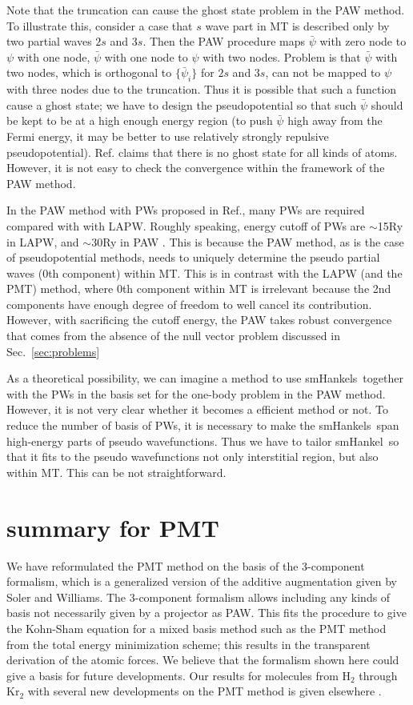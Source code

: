 \documentclass[twocolumn,showpacs,preprintnumbers,amsmath,amssymb,floatfix]{revtex4-1}
\newcommand{\refsec}[1]{\mbox{Sec.~\!\ref{#1}}}
\def\smh{smHankel}
\def\smhs{smHankels}
\def\smh{smHankel}
\def\smhs{smHankels}
\begin{document}
Note that the truncation can cause the ghost state problem in the PAW method.
To illustrate this, consider a case that $s$ wave part in MT is described
only by two partial waves $2s$ and $3s$. Then the PAW procedure maps $\bar{\psi}$ with zero node to 
$\psi$ with one node, $\bar{\psi}$ with one node to $\psi$ with two nodes. 
Problem is that $\bar{\psi}$ with two nodes, which is orthogonal to $\{\bar{\psi}_i\}$ for $2s$ and $3s$,
can not be mapped to $\psi$ with three nodes due to the truncation. 
Thus it is possible that such a function cause a ghost state;
we have to design the pseudopotential so that such $\bar{\psi}$ should be
kept to be at a high enough energy region (to push $\bar{\psi}$ high away from the
Fermi energy, it may be better to use relatively strongly repulsive pseudopotential). 
Ref.\cite{kresse99} claims that there is no
ghost state for all kinds of atoms. However, it is not easy
to check the convergence within the framework of the PAW method.

In the PAW method with PWs proposed in Ref.\cite{kresse99}, many PWs are required
compared with with LAPW. Roughly speaking, energy cutoff of PWs are
$\sim$15Ry in LAPW, and $\sim$30Ry in PAW \cite{filippi94,kresse99}.
This is because the PAW method, as is the case of pseudopotential methods,
needs to uniquely determine the pseudo partial waves (0th component) within MT.
This is in contrast with the LAPW (and the PMT) method, 
where 0th component within MT is irrelevant because 
the 2nd components have enough degree of freedom to well cancel its contribution.
However, with sacrificing the cutoff energy,
the PAW takes robust convergence that comes from the absence of the 
null vector problem discussed in \refsec{sec:problems}

As a theoretical possibility, we can imagine a method to 
use \smhs\ together with the PWs in the basis set
for the one-body problem in the PAW method.
However, it is not very clear whether it becomes 
a efficient method or not. To reduce the number of basis of PWs, it is
necessary to make the \smhs\ span high-energy parts of pseudo
wavefunctions. Thus we have to tailor \smh\ so that it fits to the pseudo
wavefunctions not only interstitial region, but also within MT. 
This can be not straightforward.


\section{summary for PMT}
We have reformulated the PMT method on the basis of the 3-component
formalism, which is a generalized version of the additive augmentation 
given by Soler and Williams. The 3-component formalism
allows including any kinds of basis not necessarily given by a
projector as PAW. This fits the procedure to give the Kohn-Sham equation for a mixed basis method such 
as the PMT method from the total energy minimization scheme; this
results in the transparent derivation of the atomic forces.
We believe that the formalism shown here could give a basis for future developments.
Our results for molecules from H$_2$ through Kr$_2$ 
with several new developments on the PMT method 
is given elsewhere \cite{kotani_linearized_2013}.
\end{document}

